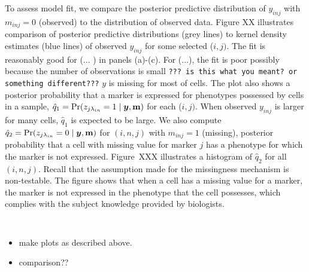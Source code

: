 \documentclass[12pt,]{article}
\def\Prob{\text{Pr}}
\newcommand{\by}{\mbox{\boldmath $y$}}
\begin{document}


To assess model fit, we compare the posterior predictive distribution of
$y_{inj}$ with $m_{inj}=0$ (observed) to the distribution of observed data.
Figure XX illustrates comparison of posterior predictive distributions (grey
lines) to kernel density estimates (blue lines) of observed $y_{inj}$ for some
selected ($i,j)$. The fit is  reasonably good for (... ) in panels (a)-(c).
For (...), the fit is poor possibly because the number of observations is small
{\tt ??? is this what you meant? or something different???}
%
$y$ is missing for most of cells.  The plot also shows a posterior probability
that a marker is expressed for phenotypes possessed by cells in a sample,
$\hat{q}_1=\Prob(z_{j \lambda_{in}}=1 \mid \by, \bf m)$ for each ($i,j)$. When
observed $y_{inj}$ is larger for many cells, $\hat{q}_1$ is expected to be
large.  We also compute $\hat{q}_2=\Prob(z_{j \lambda_{in}}=0 \mid \by, \bf m)$
for $(i,n,j)$ with $m_{inj}=1$ (missing), posterior probability that a cell
with missing value for marker $j$ has a phenotype for which the marker is not
expressed.  Figure~XXX illustrates a histogram of $\hat{q}_2$ for all $(i, n,
j)$.  Recall that the assumption made for the missingness mechanism is
non-testable.   The figure shows that when a cell has a missing value for a
marker, the marker is not expressed in the phenotype that the cell possesses,
which complies with the subject knowledge provided by biologists.  



{\tt 
\begin{itemize}
\item make plots as described above.
\item comparison??
\end{itemize} }




\end{document}
